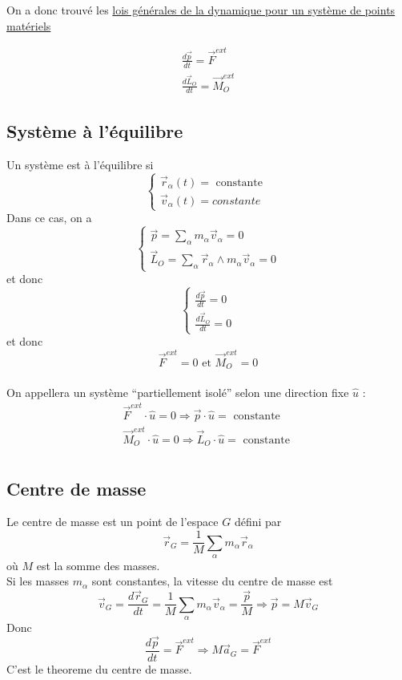 \documentclass[../main.tex]{subfiles}
\begin{document}
On a donc trouvé les \underline{lois générales de la dynamique pour un système de points matériels}

\begin{align*}
\frac{d \vec{p}}{dt} = \vec{F}^{ext} \\
\frac{d \vec{L}_O}{dt} = \vec{M}_{O} ^{ext}
\end{align*}

\subsection{Système à l'équilibre}
Un système est à l'équilibre si
\[ 
\begin{cases}
	\vec{r}_\alpha( t) = \text{ constante } \\
	\vec{v}_\alpha( t) = constante
\end{cases}
\]
Dans ce cas, on a
\[ 
\begin{cases}
\vec{p}= \sum_\alpha m_\alpha \vec{v}_\alpha = 0\\
\vec{L}_O = \sum_\alpha \vec{r}_\alpha \land m_\alpha \vec{v}_\alpha = 0
\end{cases}
\]
et donc
\[ 
\begin{cases}
\frac{d \vec{p}}{dt}=0\\
\frac{d \vec{L}_O}{dt} =0
\end{cases}
\]
et donc
\[ 
\vec{F}^{ext}=0 \text{ et } \vec{M}_O^{ext}=0
\]
\hr\\
On appellera un système ``partiellement isolé'' selon une direction fixe $\hat{u}$ :
\begin{align*}
\vec{F}^{ext}\cdot \hat{u} =0 \Rightarrow \vec{p}\cdot \hat{u}= \text{ constante } \\
\vec{M}^{ext}_O\cdot \hat{u} =0 \Rightarrow \vec{L}_O \cdot \hat{u} = \text{ constante } \\
\end{align*}
\subsection{Centre de masse}
Le centre de masse est un point de l'espace $G$ défini par
\[ 
\vec{r}_G = \frac{1}{M} \sum_\alpha m_\alpha \vec{r}_\alpha
\]
où $M$ est la somme des masses.\\
Si les masses $m_\alpha$ sont constantes, la vitesse du centre de masse est
\[ 
\vec{v}_G = \frac{d \vec{r}_G}{dt}= \frac{1}{M} \sum_\alpha m_\alpha \vec{v}_\alpha = \frac{\vec{p}}{M} \Rightarrow \vec{p}= M \vec{v}_G
\]
Donc
\[ 
\frac{d \vec{p}}{dt}= \vec{F}^{ext} \Rightarrow M\vec{a}_G = \vec{F}^{ext}
\]
C'est le theoreme du centre de masse.
\end{document}
